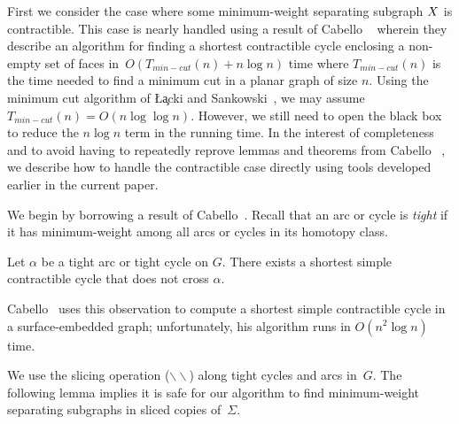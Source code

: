 \documentclass[letterpaper,review]{siamart190516}
\def\snip{\mathbin{\raisebox{0.15ex}{\rotatebox[origin=c]{60}{\Rightscissors}\!}}}
\def\snip{\mathbin{\backslash\!\!\backslash}}
\begin{document}
{First we consider the case where some minimum-weight separating subgraph $X$ is contractible.  
This case is nearly handled using a result of Cabello \etal~\cite[Theorem 5.4]{cdem-fotc-10} wherein
they describe an algorithm for finding a shortest contractible cycle enclosing a non-empty set of
faces in~\(O(T_{min-cut}(n) + n \log n)\) time where \(T_{min-cut}(n)\) is the time needed to find a
minimum cut in a planar graph of size \(n\).
Using the minimum cut algorithm of \L\c{a}cki and Sankowski~\cite{ls-mcsc-11}, we may assume
\(T_{min-cut}(n) = O(n \log \log n)\).
However, we still need to open the black box to reduce the \(n \log n\) term in the running time.
In the interest of completeness and to avoid having to repeatedly reprove lemmas and theorems from
Cabello \etal~\cite{cdem-fotc-10}, we describe how to handle the contractible case directly using
tools developed earlier in the current paper.

We begin by borrowing a result of Cabello~\cite[Lemma 4.1]{c-fscss-10}.
Recall that an arc or cycle is \emph{tight} if it has minimum-weight among all arcs or cycles in its homotopy class.

\begin{lemma}
\label{lem:disjoint-tight-arc}
Let $\alpha$ be a tight arc or tight cycle on $G$.  There exists a shortest simple contractible cycle that does not cross $\alpha$.
\end{lemma}

Cabello~\cite{c-fscss-10} uses this observation to compute a shortest simple contractible cycle in a surface-embedded graph; unfortunately, his algorithm runs in $O(n^2\log n)$ time.

We use the slicing operation ($\snip$) along tight cycles and arcs in~$G$.  The following lemma
implies it is safe for our algorithm to find minimum-weight separating subgraphs in sliced copies
of~$\Sigma$.

}
\end{document}
